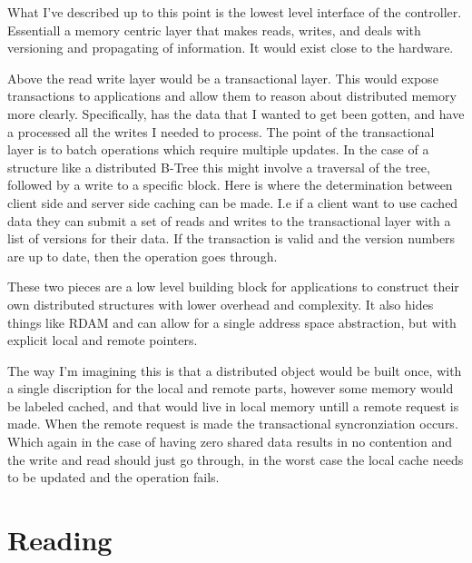 What I've described up to this point is the lowest level interface of the
controller. Essentiall a memory centric layer that makes reads, writes, and
deals with versioning and propagating of information. It would exist close to
the hardware.

Above the read write layer would be a transactional layer. This would expose
transactions to applications and allow them to reason about distributed
memory more clearly. Specifically, has the data that I wanted to get been
gotten, and have a processed all the writes I needed to process. The point of
the transactional layer is to batch operations which require multiple
updates. In the case of a structure like a distributed B-Tree this might
involve a traversal of the tree, followed by a write to a specific block.
Here is where the determination between client side and server side caching
can be made. I.e if a client want to use cached data they can submit a set of
reads and writes to the transactional layer with a list of versions for their
data. If the transaction is valid and the version numbers are up to date,
then the operation goes through.

These two pieces are a low level building block for applications to construct
their own distributed structures with lower overhead and complexity. It also
hides things like RDAM and can allow for a single address space abstraction,
but with explicit local and remote pointers.

The way I'm imagining this is that a distributed object would be built once,
with a single discription for the local and remote parts, however some memory
would be labeled cached, and that would live in local memory untill a remote
request is made. When the remote request is made the transactional
syncronziation occurs. Which again in the case of having zero shared data
results in no contention and the write and read should just go through, in
the worst case the local cache needs to be updated and the operation fails.





\section{Reading}
\label{sec:reading}

